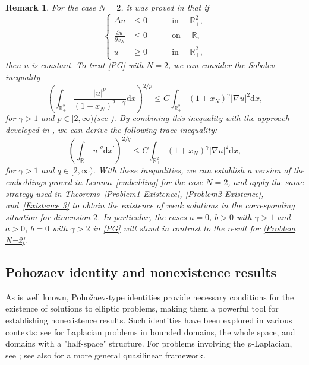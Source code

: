 \documentclass[12pt,reqno]{amsart}
\newtheorem{remark}{Remark}[section]
\begin{document}
\begin{remark}\label{N=2} For the case $N=2$, it was proved in \cite[Proposition 6.1]{Chipot-Fila-Shafir1} that if 
\begin{equation}\label{Problem N=2}
			\left\{
			\begin{aligned}
				\Delta u&\leq 0&\quad&\text{ in }\quad\mathds{R}^2_+,\\
				\frac{\partial u}{\partial x_N}&\leq 0&\quad&\text{ on }\quad\mathds{R},\\
                u&\geq0&\quad& \text{ in }\quad\mathds{R}^2_+,
			\end{aligned}
			\right.
		\end{equation}
 then $u$ is constant. To treat \eqref{PG} with $N=2$, we can consider the Sobolev inequality
\begin{equation*}
    \left(\int_{\mathds{R}^2_+}\frac{|u|^p}{(1+x_N)^{2-\gamma}}\mathrm{d}x\right)^{2/p}\leq C\int_{\mathds{R}^2_+}(1+x_N)^\gamma|\nabla u|^2\mathrm{d}x,
\end{equation*}
for $\gamma>1$ and $p \in [2,\infty)$(see \cite[Theorem 2.12]{Do-Freire-Medeiros}). By combining this inequality with the approach developed in \cite[Theorem 1.5]{AFM}, we can derive the following trace inequality:
\begin{equation*}
    \left(\int_{\mathds{R}}|u|^q\mathrm{d}x^\prime\right)^{2/q}\leq C\int_{\mathds{R}^2_+}(1+x_N)^\gamma|\nabla u|^2\mathrm{d}x, 
\end{equation*}
for $\gamma>1$ and $q\in [2,\infty)$. With these inequalities, we can establish a version of the embeddings proved in Lemma~\ref{embedding} for the case $N=2$, and apply the same strategy used in Theorems~\ref{Problem1-Existence}, \ref{Problem2-Existence}, and~\ref{Existence 3} to obtain the existence of weak solutions in the corresponding situation for dimension $2$. In particular, the cases $a= 0$, $b>0$ with $\gamma>1$ and $a>0$, $b=0$ with $\gamma>2$ in \eqref{PG} will stand in contrast to the result for \eqref{Problem N=2}.
\end{remark}

\subsection{Pohozaev identity and nonexistence results} As is well known, Pohožaev-type identities provide necessary conditions for the existence of solutions to elliptic problems, making them a powerful tool for establishing nonexistence results. Such identities have been explored in various contexts: see \cite{Berestycki-Lions, Esteban-Lions, Pohozaev} for Laplacian problems in bounded domains, the whole space, and domains with a "half-space" structure. For problems involving the \( p \)-Laplacian, see \cite{CAOM, Guedda-Veron, Ilyasov-Takac, Liu-Liu}; see also \cite{Pucci-Serrin} for a more general quasilinear framework.
\end{document}
